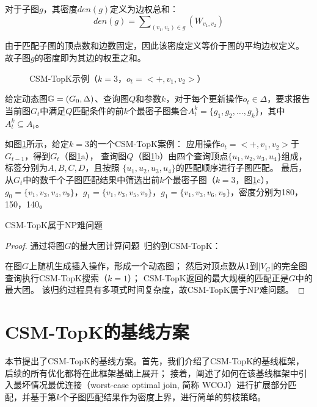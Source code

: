     \begin{definition}[子图密度]\label{def:subgraph-density}

    对于子图$g$，其密度$den(g)$定义为边权总和：
    \[
        den(g) = \sum\nolimits_{(v_1,v_2)\in g}\left(W_{v_1,v_2}\right)
    \]
    
    由于匹配子图的顶点数和边数固定，因此该密度定义等价于图的平均边权定义。
    故子图$g$的密度即为其边的权重之和。
    \end{definition}
    
    \begin{figure}[h!]
        \centering
        \caption{CSM-TopK示例（$k=3$，$o_t=<+,v_{1},v_{2}>$）}
        \label{fig:csm-topk}
    \end{figure}
    
    \begin{definition}\label{def:problem-definition}
    给定动态图$\mathbb{G}=(G_0, \Delta)$、查询图$Q$和参数$k$，对于每个更新操作$o_t\in \Delta$，要求报告当前图$G_t$中满足$Q$匹配条件的前$k$个最密子图集合$A_{t}^k= \{g_1, g_2, \ldots, g_k\}$，其中$A_t^k\subseteq A_t$。
    \end{definition}
    
    如图\ref{fig:csm-topk}所示，给定$k=3$的一个CSM-TopK案例：
    应用操作$o_t=<+,v_1, v_2>$于$G_{t-1}$，得到$G_t$（图\ref{fig:csm-topk}a），
    查询图$Q$（图\ref{fig:csm-topk}b）由四个查询顶点$\{u_1, u_2, u_3, u_4\}$组成，标签分别为$A,B,C,D$，且按照
    $\{u_1, u_2, u_3, u_4\}$的匹配顺序进行子图匹配。
    最后，从$G_t$中的数千个子图匹配结果中筛选出前$k$个最密子图（$k=3$，图\ref{fig:csm-topk}c），
    $g_0=\{v_1, v_3, v_4, v_9\}$，$g_1=\{v_1, v_3, v_5, v_9\}$，$g_1=\{v_1, v_3, v_6, v_9\}$，密度分别为180，150，140。
    
    \begin{theorem} \label{theorem:np-hard}
    CSM-TopK属于NP难问题
    \end{theorem}
    \begin{proof}
    通过将图$G$的最大团计算问题~\cite{clique-DBLP:journals/eor/WuH15}归约到CSM-TopK：
   
    在图$G$上随机生成插入操作，形成一个动态图；
    然后对顶点数从1到$|V_G|$的完全图查询执行CSM-TopK搜索（$k=1$）；
    CSM-TopK返回的最大规模的匹配正是$G$中的最大团。
    该归约过程具有多项式时间复杂度，故CSM-TopK属于NP难问题。
    \end{proof}
\section{CSM-TopK的基线方案}
本节提出了CSM-TopK的基线方案。首先，我们介绍了CSM-TopK的基线框架，后续的所有优化都将在此框架基础上展开；
接着，阐述了如何在该基线框架中引入最坏情况最优连接（worst-case optimal join, 简称 WCOJ）进行扩展部分匹配，并基于第$k$个子图匹配结果作为密度上界，进行简单的剪枝策略。
